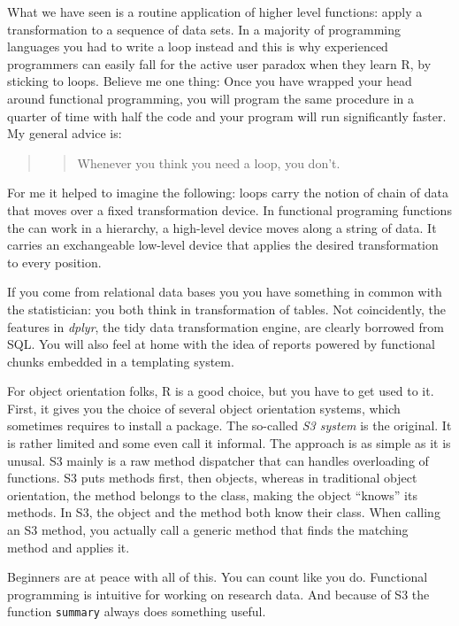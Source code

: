 \documentclass[]{svmono}
\theoremstyle{definition}
\theoremstyle{definition}
\theoremstyle{definition}
\theoremstyle{remark}
\begin{document}
What we have seen is a routine application of higher level functions:
apply a transformation to a sequence of data sets. In a majority of
programming languages you had to write a loop instead and this is why
experienced programmers can easily fall for the active user paradox when
they learn R, by sticking to loops. Believe me one thing: Once you have
wrapped your head around functional programming, you will program the
same procedure in a quarter of time with half the code and your program
will run significantly faster. My general advice is:

\begin{quote}
\begin{quote}
Whenever you think you need a loop, you don't.
\end{quote}
\end{quote}

For me it helped to imagine the following: loops carry the notion of
chain of data that moves over a fixed transformation device. In
functional programing functions the can work in a hierarchy, a
high-level device moves along a string of data. It carries an
exchangeable low-level device that applies the desired transformation to
every position.

If you come from relational data bases you you have something in common
with the statistician: you both think in transformation of tables. Not
coincidently, the features in \emph{dplyr}, the tidy data transformation
engine, are clearly borrowed from SQL. You will also feel at home with
the idea of reports powered by functional chunks embedded in a
templating system.

For object orientation folks, R is a good choice, but you have to get
used to it. First, it gives you the choice of several object orientation
systems, which sometimes requires to install a package. The so-called
\emph{S3 system} is the original. It is rather limited and some even
call it informal. The approach is as simple as it is unusal. S3 mainly
is a raw method dispatcher that can handles overloading of functions. S3
puts methods first, then objects, whereas in traditional object
orientation, the method belongs to the class, making the object
``knows'' its methods. In S3, the object and the method both know their
class. When calling an S3 method, you actually call a generic method
that finds the matching method and applies it.

Beginners are at peace with all of this. You can count like you do.
Functional programming is intuitive for working on research data. And
because of S3 the function \texttt{summary} always does something
useful.
\end{document}
